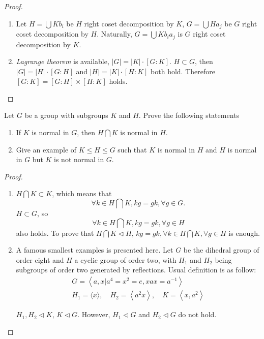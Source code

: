 \begin{proof}
    \begin{enumerate}
        \item 
        
        Let $H=\bigcup Kb_i$ be $H$ right coset decomposition by $K$, $G=\bigcup Ha_j$ be $G$ right coset decomposition by $H$. Naturally, $G=\bigcup Kb_ia_j$ is $G$ right coset decomposition by $K$.
        \item 
        \textit{Lagrange theorem} is available, $|G|=|K|\cdot [G:K]$. $H \subset G$, then $|G|=|H|\cdot [G:H]$ and $|H|=|K|\cdot [H:K]$ both hold. Therefore $[G : K] = [G : H] \times [H : K]$ holds.
    \end{enumerate}
\end{proof}

\begin{exercise}
    Let $G$ be a group with subgroups $K$ and $H$. Prove the following statements
    \begin{enumerate}
        \item  If $K$ is normal in $G$, then $H \bigcap K$ is normal in $H$.
        \item Give an example of $K \leq H \leq G$ such that $K$ is normal in $H$ and $H$ is normal in $G$ but $K$ is not normal in $G$.
    \end{enumerate}
\end{exercise}

\begin{proof}
    \begin{enumerate}
        \item 
        $H\bigcap K\subset K$, which means that $$\forall k\in H\bigcap K, kg=gk, \forall g\in G.$$ $H\subset G$, so $$\forall k\in H\bigcap K, kg=gk, \forall g\in H$$ also holds. 
        To prove that $H\bigcap K\triangleleft H$, $ kg=gk, \forall k\in H\bigcap K, \forall g \in H$ is enough.
        \item 
        A famous smallest examples is presented here. Let $G$ be the dihedral group of order eight and $H$ a cyclic group of order two, with $H_1$ and $H_2$ being subgroups of order two generated by reflections. Usual definition is as follow:
        $$
        \begin{array}{l}{G=\left\langle a, x | a^{4}=x^{2}=e, x a x=a^{-1}\right\rangle} \\ { H_{1}=\langle x\rangle, \quad H_{2}=\left\langle a^{2} x\right\rangle, \quad K=\left\langle x, a^{2}\right\rangle}\end{array}
        $$

        $H_1,H_2\triangleleft K$, $K\triangleleft G$. However, $H_1\triangleleft G$ and $H_2\triangleleft G$ do not hold.
    \end{enumerate}
\end{proof}

